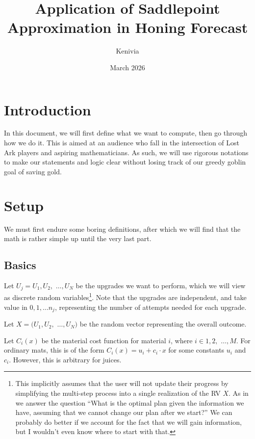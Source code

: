 \documentclass[a4paper,11pt]{article}
\begin{document}


\title{Application of Saddlepoint Approximation in Honing Forecast}
\date{March 2026}
\author{Kenivia}

\maketitle
\tableofcontents
\newpage

\section{Introduction}

In this document, we will first define what we want to compute, then go through how we do it. This is aimed at an audience who fall in the intersection of Lost Ark players and aspiring mathematicians. As such, we will use rigorous notations to make our statements and logic clear without losing track of our greedy goblin goal of saving gold. 


\section{Setup}

We must first endure some boring definitions, after which we will find that the math is rather simple up until the very last part.

\subsection{Basics}
Let $U_j = U_1, U_2,$ $\ldots , U_N$ be the upgrades we want to perform, which we will view as discrete random variables\footnote{This implicitly assumes that the user will not update their progress by simplifying the multi-step process into a single realization of the RV $X$. As in we answer the question ``What is the optimal plan given the information we have, assuming that we cannot change our plan after we start?'' We can probably do better if we account for the fact that we will gain information, but I wouldn't even know where to start with that. 
}. Note that the upgrades are independent, and take value in $0, 1, \ldots n_j$, representing the number of attempts needed for each upgrade.

\noindent
Let $X = (U_1, U_2,$ $\ldots , U_N)$ be the random vector representing the overall outcome.

Let $C_i(x)$ be the material cost function for material $i$, where $i \in 1,2,$ $\ldots, M$. For ordinary mats, this is of the form $C_i(x) = u_i + c_i \cdot x$ for some constants $u_i$ and $c_i$. However, this is arbitrary for juices.
\end{document}
